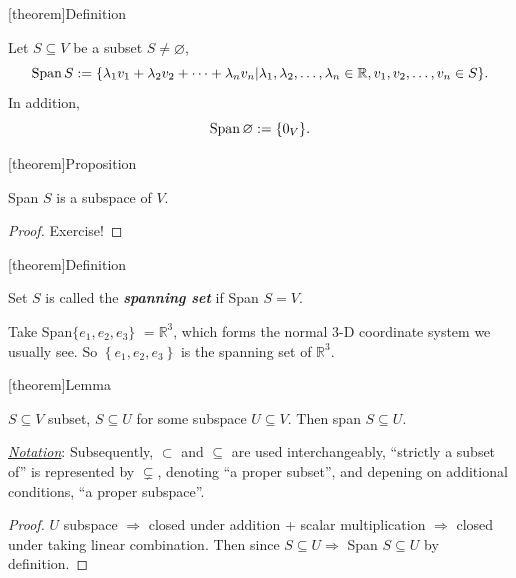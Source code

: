 \documentclass[12pt]{report}
\theoremstyle{definition}
\begin{document}
[theorem]{Definition}
\begin{span of a subset of vector space}
    Let $S \subseteq V$ be a subset $S \neq \varnothing$,\[
        \textnormal{Span}\,S:= \{\lambda_1 v_1 + \lambda_2 v_2 + \cdots + \lambda_n v_n |
        \lambda_1, \lambda_2, \ldots, \lambda_n \in \mathbb{R}, v_1, v_2, \ldots, v_n \in S\}.
    \]
    In addition, \[
        \textnormal{Span}\,\varnothing := \{0_V\}.
    \]
\end{span of a subset of vector space}

[theorem]{Proposition}
\begin{span S is a subspace}
    Span $S$ is a subspace of $V$.
\end{span S is a subspace}

\begin{proof}
    Exercise!
\end{proof}

[theorem]{Definition}
\begin{spanning set S}
    Set $S$ is called the \textbf{\emph{spanning set}} if Span $S = V$.
\end{spanning set S}

\begin{ex}
    Take Span$\{e_1, e_2, e_3\}$ $= \mathbb{R}^{3}$,
    which forms the normal 3-D coordinate system we usually see.
    So $\left\{e_1, e_2, e_3\right\}$ is the spanning set of $\mathbb{R}^{3}$.
\end{ex}

[theorem]{Lemma}
\begin{span of subset of subspace}\label{lemma:1}
    $S \subseteq V$ subset, $S \subseteq U$ for some subspace $U \subseteq V$.
    Then span $S \subseteq U$.
\end{span of subset of subspace}

\emph{\underline{Notation}}: Subsequently, $\subset$ and $\subseteq$ are used interchangeably,
``strictly a subset of'' is represented by $\subsetneq$,
denoting ``a proper subset'', and depening on additional conditions,
``a proper subspace''.

\begin{proof}
    $U$ subspace $\Rightarrow{}$ closed under addition + scalar multiplication
    $\Rightarrow{}$ closed under taking linear combination.
    Then since $S \subseteq U \Rightarrow{}$ Span $S \subseteq U$ by definition.
\end{proof}
\end{document}
